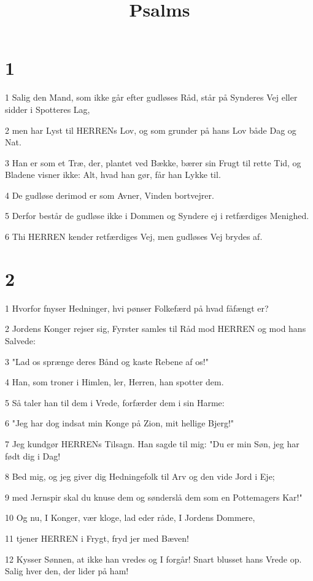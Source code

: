 

\title{Psalms}


\chapter{1}

\par 1 Salig den Mand, som ikke går efter gudløses Råd, står på Synderes Vej eller sidder i Spotteres Lag,
\par 2 men har Lyst til HERRENs Lov, og som grunder på hans Lov både Dag og Nat.
\par 3 Han er som et Træ, der, plantet ved Bække, bærer sin Frugt til rette Tid, og Bladene visner ikke: Alt, hvad han gør, får han Lykke til.
\par 4 De gudløse derimod er som Avner, Vinden bortvejrer.
\par 5 Derfor består de gudløse ikke i Dommen og Syndere ej i retfærdiges Menighed.
\par 6 Thi HERREN kender retfærdiges Vej, men gudløses Vej brydes af.

\chapter{2}

\par 1 Hvorfor fnyser Hedninger, hvi pønser Folkefærd på hvad fåfængt er?
\par 2 Jordens Konger rejser sig, Fyrster samles til Råd mod HERREN og mod hans Salvede:
\par 3 "Lad os sprænge deres Bånd og kaste Rebene af os!"
\par 4 Han, som troner i Himlen, ler, Herren, han spotter dem.
\par 5 Så taler han til dem i Vrede, forfærder dem i sin Harme:
\par 6 "Jeg har dog indsat min Konge på Zion, mit hellige Bjerg!"
\par 7 Jeg kundgør HERRENs Tilsagn. Han sagde til mig: "Du er min Søn, jeg har født dig i Dag!
\par 8 Bed mig, og jeg giver dig Hedningefolk til Arv og den vide Jord i Eje;
\par 9 med Jernspir skal du knuse dem og sønderslå dem som en Pottemagers Kar!"
\par 10 Og nu, I Konger, vær kloge, lad eder råde, I Jordens Dommere,
\par 11 tjener HERREN i Frygt, fryd jer med Bæven!
\par 12 Kysser Sønnen, at ikke han vredes og I forgår! Snart blusset hans Vrede op. Salig hver den, der lider på ham!

